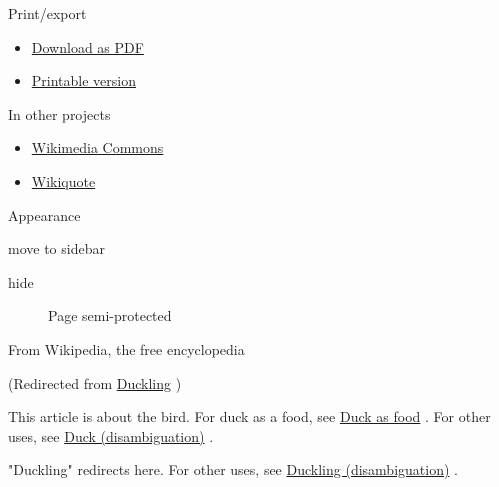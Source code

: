 \documentclass[11pt,a4paper]{article}
\begin{document}
Print/export

\begin{itemize}
\item \href{/w/index.php?title=Special:DownloadAsPdf\&page=Duck\&action=show-download-screen}{Download as PDF}
\item \href{/w/index.php?title=Duck\&printable=yes}{Printable version}
\end{itemize}

In other projects

\begin{itemize}
\item \href{https://commons.wikimedia.org/wiki/Category:Ducks}{Wikimedia Commons}
\item \href{https://en.wikiquote.org/wiki/Duck}{Wikiquote}
\end{itemize}

Appearance

move to sidebar

hide

\begin{figure}[h]
\caption{Page semi-protected}
\end{figure}

From Wikipedia, the free encyclopedia

(Redirected from \href{/w/index.php?title=Duckling\&redirect=no}{Duckling} )

This article is about the bird. For duck as a food, see \href{/wiki/Duck\_as\_food}{Duck as food} . For other uses, see \href{/wiki/Duck\_\%28disambiguation\%29}{Duck (disambiguation)} .

"Duckling" redirects here. For other uses, see \href{/wiki/Duckling\_\%28disambiguation\%29}{Duckling (disambiguation)} .
\end{document}
